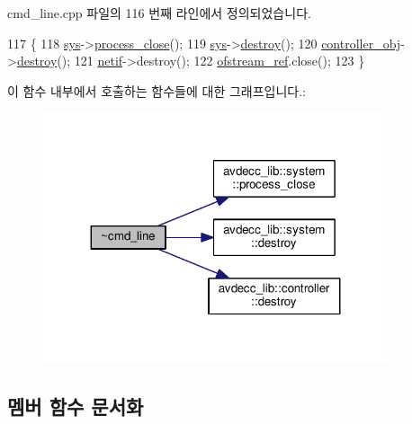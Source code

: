 cmd\+\_\+line.\+cpp 파일의 116 번째 라인에서 정의되었습니다.


\begin{DoxyCode}
117 \{
118     \hyperlink{classcmd__line_a485db4800e331cb4052c447fdf5d154e}{sys}->\hyperlink{classavdecc__lib_1_1system_a1065ec20ef44ca9d8d66d81bb369a28f}{process\_close}();
119     \hyperlink{classcmd__line_a485db4800e331cb4052c447fdf5d154e}{sys}->\hyperlink{classavdecc__lib_1_1system_a3fb39895d6d015a25c95b846a3f9bdc0}{destroy}();
120     \hyperlink{classcmd__line_af0a7784509e5bf1210a2aa19cea5df70}{controller\_obj}->\hyperlink{classavdecc__lib_1_1controller_a3fb39895d6d015a25c95b846a3f9bdc0}{destroy}();
121     \hyperlink{structnetif}{netif}->destroy();
122     \hyperlink{classcmd__line_a8ecbb7e6f42fc1b6d974b169f0baa229}{ofstream\_ref}.close();
123 \}
\end{DoxyCode}


이 함수 내부에서 호출하는 함수들에 대한 그래프입니다.\+:
\nopagebreak
\begin{figure}[H]
\begin{center}
\leavevmode
\includegraphics[width=287pt]{classcmd__line_aded54b241b313595eda98e2de3a0ba5e_cgraph}
\end{center}
\end{figure}




\subsection{멤버 함수 문서화}
